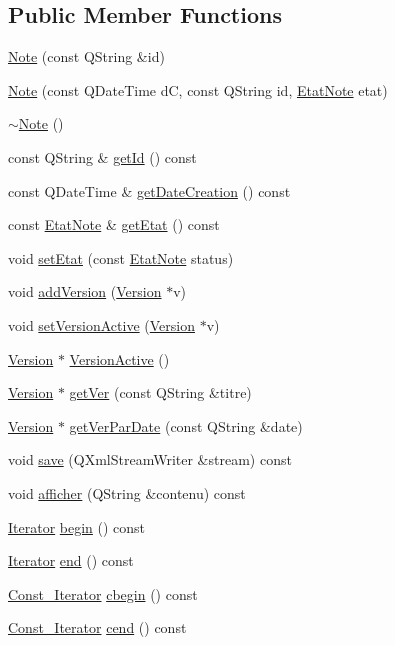 \subsection*{Public Member Functions}
\begin{DoxyCompactItemize}
\item 
\hyperlink{classNote_aa14ef19a570f816f5e1676274cbb2ec8}{Note} (const Q\+String \&id)
\item 
\hyperlink{classNote_a09f97956f6e0eebde92fb2eff0824285}{Note} (const Q\+Date\+Time dC, const Q\+String id, \hyperlink{notes_8h_af31cb418aefc865e5631c7f76c4aea9d}{Etat\+Note} etat)
\item 
\hyperlink{classNote_ade484273015c82e7fa59a028de0d8818}{$\sim$\+Note} ()
\item 
const Q\+String \& \hyperlink{classNote_aa8ab92c055d599f3eeafcc745b83b74d}{get\+Id} () const 
\item 
const Q\+Date\+Time \& \hyperlink{classNote_a593982547e5e6321af31847aa5b98872}{get\+Date\+Creation} () const 
\item 
const \hyperlink{notes_8h_af31cb418aefc865e5631c7f76c4aea9d}{Etat\+Note} \& \hyperlink{classNote_a8e12c5fa596ca0acfc583f5f4f1a259e}{get\+Etat} () const 
\item 
void \hyperlink{classNote_a4f6a36078ffb122e921e47a99f99c96b}{set\+Etat} (const \hyperlink{notes_8h_af31cb418aefc865e5631c7f76c4aea9d}{Etat\+Note} status)
\item 
void \hyperlink{classNote_a86b84819e19ac9857af178682ee53a45}{add\+Version} (\hyperlink{classVersion}{Version} $\ast$v)
\item 
void \hyperlink{classNote_a1608cf058a6af2c5ea85cb832fb4fb15}{set\+Version\+Active} (\hyperlink{classVersion}{Version} $\ast$v)
\item 
\hyperlink{classVersion}{Version} $\ast$ \hyperlink{classNote_a17459a5620f6e0695d61815bfcf6c38c}{Version\+Active} ()
\item 
\hyperlink{classVersion}{Version} $\ast$ \hyperlink{classNote_a37256574f7cf8b99055de42b690b0a33}{get\+Ver} (const Q\+String \&titre)
\item 
\hyperlink{classVersion}{Version} $\ast$ \hyperlink{classNote_a4eb65d5ed46274013e6d9a7f21434425}{get\+Ver\+Par\+Date} (const Q\+String \&date)
\item 
void \hyperlink{classNote_a3da45485357d159c9c2948891b6f7e02}{save} (Q\+Xml\+Stream\+Writer \&stream) const 
\item 
void \hyperlink{classNote_a61bb6152ac12145129a4a2ef70fe97d0}{afficher} (Q\+String \&contenu) const 
\item 
\hyperlink{classNote_1_1Iterator}{Iterator} \hyperlink{classNote_abd7bd6e221b72c3d0b31e76b2c3842eb}{begin} () const 
\item 
\hyperlink{classNote_1_1Iterator}{Iterator} \hyperlink{classNote_a2956dca10da1ac6015389bb8fe00495d}{end} () const 
\item 
\hyperlink{classNote_1_1Const__Iterator}{Const\+\_\+\+Iterator} \hyperlink{classNote_ac1fb72c7dd6568cfcbd678c0ffcc60ae}{cbegin} () const 
\item 
\hyperlink{classNote_1_1Const__Iterator}{Const\+\_\+\+Iterator} \hyperlink{classNote_a32060bd56a39dd438d79ffc6df72420c}{cend} () const 
\end{DoxyCompactItemize}
